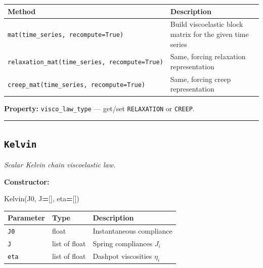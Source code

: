 \documentclass[
  a4paper,
  numbers=noendperiod,
  DIV=12]{scrreprt}
\newenvironment{Shaded}{\begin{snugshade}}{\end{snugshade}}
\newcommand{\NormalTok}[1]{#1}
\newcommand{\OperatorTok}[1]{\textcolor[rgb]{0.81,0.36,0.00}{\textbf{#1}}}
\newcounter{none} %
\begin{document}
{\def\LTcaptype{none} %
\begin{longtable}[]{@{}
  >{\raggedright\arraybackslash}p{}
  >{\raggedright\arraybackslash}p{}@{}}
\toprule\noalign{}
\begin{minipage}[b]{\linewidth}\raggedright
Method
\end{minipage} & \begin{minipage}[b]{\linewidth}\raggedright
Description
\end{minipage} \\
\midrule\noalign{}
\endhead
\bottomrule\noalign{}
\endlastfoot
\texttt{mat(time\_series,\ recompute=True)} & Build viscoelastic block
matrix for the given time series \\
\texttt{relaxation\_mat(time\_series,\ recompute=True)} & Same, forcing
relaxation representation \\
\texttt{creep\_mat(time\_series,\ recompute=True)} & Same, forcing creep
representation \\
\end{longtable}
}

\textbf{Property:} \texttt{visco\_law\_type} --- get/set
\texttt{RELAXATION} or \texttt{CREEP}.

\begin{center}\rule{0.5\linewidth}{0.5pt}\end{center}

\subsection{\texorpdfstring{\texttt{Kelvin}}{Kelvin}}\label{api-Kelvin}

\emph{Scalar Kelvin chain viscoelastic law.}

\textbf{Constructor:}

\begin{Shaded}
\begin{Highlighting}[]
\NormalTok{Kelvin(J0, J}\OperatorTok{=}\NormalTok{[], eta}\OperatorTok{=}\NormalTok{[])}
\end{Highlighting}
\end{Shaded}

{\def\LTcaptype{none} %
\begin{longtable}[]{@{}lll@{}}
\toprule\noalign{}
Parameter & Type & Description \\
\midrule\noalign{}
\endhead
\bottomrule\noalign{}
\endlastfoot
\texttt{J0} & float & Instantaneous compliance \\
\texttt{J} & list of float & Spring compliances \(J_i\) \\
\texttt{eta} & list of float & Dashpot viscosities \(\eta_i\) \\
\end{longtable}
}
\end{document}
